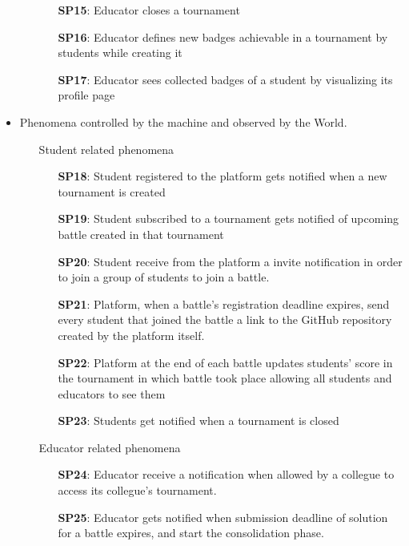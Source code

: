 \documentclass{article}
\begin{document}
\begin{itemize}
\begin{enumerate}
\begin{enumerate}
                    \item[\textbf{SP15}:] Educator closes a tournament
                    \item[\textbf{SP16}:] Educator defines new badges achievable in a tournament by students while creating it
                    \item[\textbf{SP17}:] Educator sees collected badges of a student by visualizing its profile page
                \end{enumerate}
            \end{enumerate} 

            \item Phenomena controlled by the machine and observed by the World.
            \begin{enumerate}
                \item[\ding{228}] Student related phenomena
                \begin{enumerate}
                    \item[\textbf{SP18}:] Student registered to the platform gets notified when a new tournament is created
                    \item[\textbf{SP19}:] Student subscribed to a tournament gets notified of upcoming battle created in that tournament
                    \item[\textbf{SP20}:] Student receive from the platform a invite notification in order to join a group of students to join a battle.
                    \item[\textbf{SP21}:] Platform, when a battle's registration deadline expires, send every student that joined the battle a link to the GitHub repository created by the platform itself.
                    \item[\textbf{SP22}:] Platform at the end of each battle updates students' score in the tournament in which battle took place allowing all students and educators to see them
                    \item[\textbf{SP23}:] Students get notified when a tournament is closed
                \end{enumerate}
                \item[\ding{228}] Educator related phenomena
                \begin{enumerate}
                    \item[\textbf{SP24}:] Educator receive a notification when allowed by a collegue to access its collegue's tournament.
                    \item[\textbf{SP25}:] Educator gets notified when submission deadline of solution for a battle expires, and start the consolidation phase.
                \end{enumerate}
            \end{enumerate}
        \end{itemize}
\end{document}
